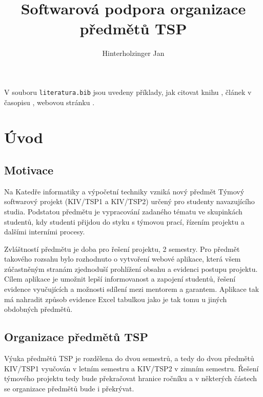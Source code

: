 \documentclass[czech,BP]{thesiskiv}
\author{Hinterholzinger Jan}
\title{Softwarová podpora organizace předmětů TSP}
\begin{document}
%
\maketitle
\tableofcontents

V souboru \texttt{literatura.bib} jsou uvedeny příklady, jak citovat knihu \cite{KnuthAOCP2}, článek v časopisu \cite{Hoare1961}, webovou stránku \cite{Graphics2D}.
\chapter{Úvod}
\section{Motivace}
	\par Na Katedře informatiky a výpočetní techniky vzniká nový předmět Týmový softwarový projekt (KIV/TSP1 a KIV/TSP2) určený pro studenty navazujícího studia. Podstatou předmětu je vypracování zadaného tématu ve skupinkách studentů, kdy studenti přijdou do styku s týmovou prací, řízením projektu a dalšími interními procesy.
	\par Zvláštností předmětu je doba pro řešení projektu, 2 semestry. Pro předmět takového rozsahu bylo rozhodnuto o vytvoření webové aplikace, která všem zúčastněným stranám zjednoduší prohlížení obsahu a evidenci postupu projektu. Cílem aplikace je umožnit lepší informovanost a zapojení studentů, řešení evidence vyučujících a možnosti sdílení mezi mentorem a garantem. Aplikace tak má nahradit způsob evidence Excel tabulkou jako je tak tomu u jiných obdobných předmětů.
\section{Organizace předmětů TSP}
	\par Výuka předmětů TSP je rozdělena do dvou semestrů, a tedy do dvou předmětů KIV/TSP1 vyučován v letním semestru a KIV/TSP2 v zimním semestru. Řešení týmového projektu tedy bude překračovat hranice ročníku a v některých částech se organizace předmětů bude i překrývat.
\end{document}
